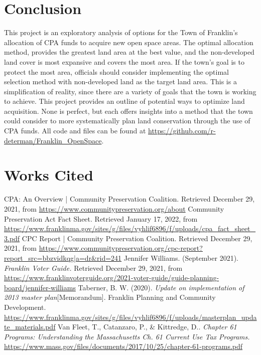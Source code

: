 \documentclass[12pt, stu, floatsintext,table]{apa7}
\begin{document}
\section{Conclusion}
This project is an exploratory analysis of options for the Town of Franklin's allocation of CPA funds to acquire new open space areas. The optimal allocation method, provides the greatest land area at the best value, and the non-developed land cover is most expansive and covers the most area. If the town's goal is to protect the most area, officials should consider implementing the optimal selection method with non-developed land as the target land area. This is a simplification of reality, since there are a variety of goals that the town is working to achieve. This project provides an outline of potential ways to optimize land acquisition. None is perfect, but each offers insights into a method that the town could consider to more systematically plan land conservation through the use of CPA funds.  
\newline
\newline
All code and files can be found at \url{https://github.com/r-determan/Franklin_OpenSpace}. 
\newpage
\section{Works Cited}
\onehalfspacing
\begin{flushleft}
CPA: An Overview | Community Preservation Coalition. Retrieved December 29, 2021, from \url{https://www.communitypreservation.org/about}  
\newline
\newline
Community Preservation Act Fact Sheet. Retrieved January 17, 2022, from \url{https://www.franklinma.gov/sites/g/files/vyhlif6896/f/uploads/cpa_fact_sheet_3.pdf}
\newline 
\newline
CPC Report | Community Preservation Coalition. Retrieved December 29, 2021, from \url{https://www.communitypreservation.org/cpc-report?report_src=bbzvidkqg|a=dr&rid=241} 
\newline 
\newline
Jennifer Williams. (September 2021). \emph{Franklin Voter Guide.} Retrieved December 29, 2021, from \url{https://www.franklinvoterguide.org/2021-voter-guide/guide-planning-board/jennifer-williams} 
\newline
\newline
Taberner, B. W. (2020). \emph{Update on implementation of 2013 master plan}[Memorandum]. Franklin Planning and Community Development. \url{https://www.franklinma.gov/sites/g/files/vyhlif6896/f/uploads/masterplan_update_materials.pdf}  
\newline
\newline
Van Fleet, T., Catanzaro, P., \& Kittredge, D.. \emph{Chapter 61 Programs: Understanding the Massachusetts Ch. 61 Current Use Tax Programs.} \url{https://www.mass.gov/files/documents/2017/10/25/chapter-61-programs.pdf}
\end{flushleft}
\newpage
\end{document}
